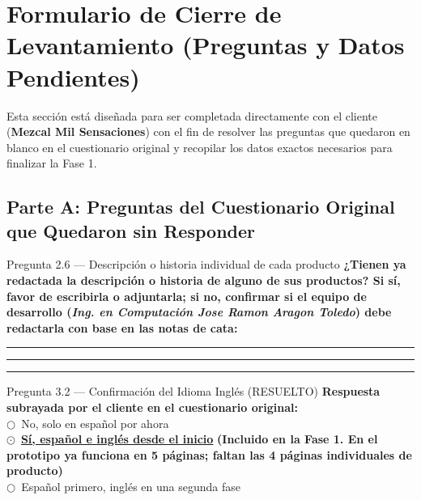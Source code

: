 \documentclass[11pt,letterpaper]{article}
\newcommand{\uradio}{$\bigcirc$}
\newcommand{\radio}{\textcolor{mezcalAgave}{\textbf{$\odot$}}}
\newcommand{\fillline}[1][1.0\linewidth]{%
    \par\vspace{0.35em}\noindent\textcolor{gray!70}{\rule{#1}{0.5pt}}\par\vspace{0.25em}%
}
\begin{document}
\newpage

\section{Formulario de Cierre de Levantamiento (Preguntas y Datos Pendientes)}

Esta sección está diseñada para ser completada directamente con el cliente (\textbf{Mezcal Mil Sensaciones}) con el fin de resolver las preguntas que quedaron en blanco en el cuestionario original y recopilar los datos exactos necesarios para finalizar la Fase 1.

\subsection{Parte A: Preguntas del Cuestionario Original que Quedaron sin Responder}

\begin{pendingbox}{Pregunta 2.6 — Descripción o historia individual de cada producto}
\textbf{¿Tienen ya redactada la descripción o historia de alguno de sus productos? Si sí, favor de escribirla o adjuntarla; si no, confirmar si el equipo de desarrollo (\textit{Ing. en Computación Jose Ramon Aragon Toledo}) debe redactarla con base en las notas de cata:}
\fillline
\fillline
\fillline
\end{pendingbox}

\begin{pendingbox}{Pregunta 3.2 — Confirmación del Idioma Inglés (RESUELTO)}
\textbf{Respuesta subrayada por el cliente en el cuestionario original:}\\[0.4em]
\uradio\ No, solo en español por ahora\\[0.25em]
\radio\ \underline{\textbf{Sí, español e inglés desde el inicio}} \quad \textcolor{mezcalAgave}{\textbf{(Incluido en la Fase 1. En el prototipo ya funciona en 5 páginas; faltan las 4 páginas individuales de producto)}}\\[0.25em]
\uradio\ Español primero, inglés en una segunda fase
\end{pendingbox}
\end{document}
